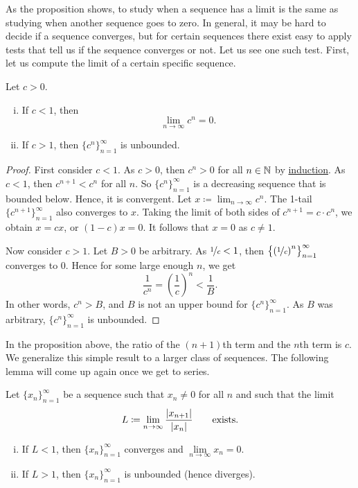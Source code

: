 As the proposition shows, to study when a sequence has a limit is 
the same as studying when another sequence goes to zero.
In general, it may be hard to decide if a sequence converges, but
for certain sequences there exist easy to apply tests that tell us
if the sequence converges or not.  Let us see one such test.
First, let
us compute the limit of a certain specific sequence.

\begin{prop}
Let $c > 0$.
\begin{enumerate}[(i)]
\item
If $c < 1$, then
\begin{equation*}
\lim_{n\to\infty} c^n = 0.
\end{equation*}
\item
If $c > 1$, then $\{ c^n \}_{n=1}^\infty$ is unbounded.
\end{enumerate}
\end{prop}

\begin{proof}
First consider $c < 1$.  As $c > 0$, then $c^n > 0$ for all $n \in {\mathbb{N}}$ by
\hyperref[induction:thm]{induction}.  As $c < 1$, then $c^{n+1} < c^n$ for all $n$.
So $\{ c^n \}_{n=1}^\infty$ is
a decreasing sequence that is bounded below.  Hence, it is convergent.
Let $x \coloneqq \lim_{n\to\infty} c^n$.  The 1-tail $\{ c^{n+1} \}_{n=1}^\infty$
also converges to $x$.  Taking the limit of both sides of $c^{n+1} = c \cdot
c^n$, we obtain $x = cx$, or $(1-c)x=0$.  It follows that $x=0$ as $c \not= 1$.

Now consider $c > 1$.
Let $B > 0$ be arbitrary.
As $\nicefrac{1}{c} < 1$, then $\bigl\{ {(\nicefrac{1}{c})}^n \bigr\}_{n=1}^\infty$
converges to $0$.
Hence for some large enough $n$, we get
\begin{equation*}
\frac{1}{c^n} =
{\left(\frac{1}{c}\right)}^n < \frac{1}{B} .
\end{equation*}
In other words, $c^n > B$, and $B$ is not an upper bound for 
$\{ c^n \}_{n=1}^\infty$.  As $B$ was arbitrary, $\{ c^n \}_{n=1}^\infty$ is unbounded.
\end{proof}

In the proposition above, the
ratio of the $(n+1)$th term and the $n$th term is $c$.  We 
generalize this simple result to a larger class of sequences.
The following lemma will come up again once we get to series.

\begin{lemma}
\label{seq:ratiotest}
Let $\{ x_n \}_{n=1}^\infty$ be a sequence such that $x_n \not= 0$ for all $n$ and such that
the limit
\begin{equation*}
L \coloneqq \lim_{n\to\infty} \frac{\left\lvert {x_{n+1}} \right\rvert}{\left\lvert {x_n} \right\rvert}
\qquad
\text{exists.}
\end{equation*}
\begin{enumerate}[(i)]
\item
If $L < 1$, then $\{ x_n \}_{n=1}^\infty$ converges and $\lim\limits_{n\to\infty} x_n = 0$.
\item
If $L > 1$, then $\{ x_n \}_{n=1}^\infty$ is unbounded (hence diverges).
\end{enumerate}
\end{lemma}

